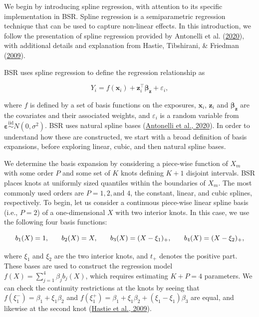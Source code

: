 \documentclass[12pt, twoside]{amherstthesis}
\begin{document}
We begin by introducing spline regression, with attention to its specific implementation in BSR. Spline regression is a semiparametric regression technique that can be used to capture non-linear effects. In this introduction, we follow the presentation of spline regression provided by Antonelli et al. (\protect\hyperlink{ref-antonelli_estimating_2020}{2020}), with additional details and explanation from Hastie, Tibshirani, \& Friedman (\protect\hyperlink{ref-hastie_elements_2009}{2009}).

BSR uses spline regression to define the regression relationship as

\[
Y_i = f(\textbf{x}_i) + \textbf{z}_i^\top \boldsymbol{\beta}_{\textbf{z}} +\varepsilon_i,
\]

\noindent where \(f\) is defined by a set of basis functions on the exposures, \(\textbf{x}_i\), \(\textbf{z}_i\) and \(\boldsymbol{\beta}_{\textbf{z}}\) are the covariates and their associated weights, and \(\varepsilon_i\) is a random variable from \(\boldsymbol\varepsilon \overset{\mathrm{iid}}{\sim} N(0, \sigma^2)\). BSR uses natural spline bases (\protect\hyperlink{ref-antonelli_estimating_2020}{Antonelli et al., 2020}). In order to understand how these are constructed, we start with a broad definition of basis expansions, before exploring linear, cubic, and then natural spline bases.

We determine the basis expansion by considering a piece-wise function of \(X_m\) with some order \(P\) and some set of \(K\) knots defining \(K+1\) disjoint intervals. BSR places knots at uniformly sized quantiles within the boundaries of \(X_m\). The most commonly used orders are \(P=1,2,\textrm{and } 4\), the constant, linear, and cubic splines, respectively. To begin, let us consider a continuous piece-wise linear spline basis (i.e., \(P=2\)) of a one-dimensional \(X\) with two interior knots. In this case, we use the following four basis functions:

\nointerlineskip

\[
b_1(X)=1, \hspace{0.25in} b_2(X)=X, \hspace{0.25in} b_3(X)=(X-\xi_1)_+, \hspace{0.25in} b_4(X)=(X-\xi_2)_+,
\]

\noindent where \(\xi_1\) and \(\xi_2\) are the two interior knots, and \(t_+\) denotes the positive part. These bases are used to construct the regression model \(f(X)=\sum_{j=1}^4\beta_jb_j(X)\), which requires estimating \(K+P=4\) parameters. We can check the continuity restrictions at the knots by seeing that \(f(\xi_1^-)=\beta_1 + \xi_1\beta_2\) and \(f(\xi_1^+)= \beta_1 + \xi_1\beta_2+ (\xi_1-\xi_1)\beta_3\) are equal, and likewise at the second knot (\protect\hyperlink{ref-hastie_elements_2009}{Hastie et al., 2009}).
\end{document}
